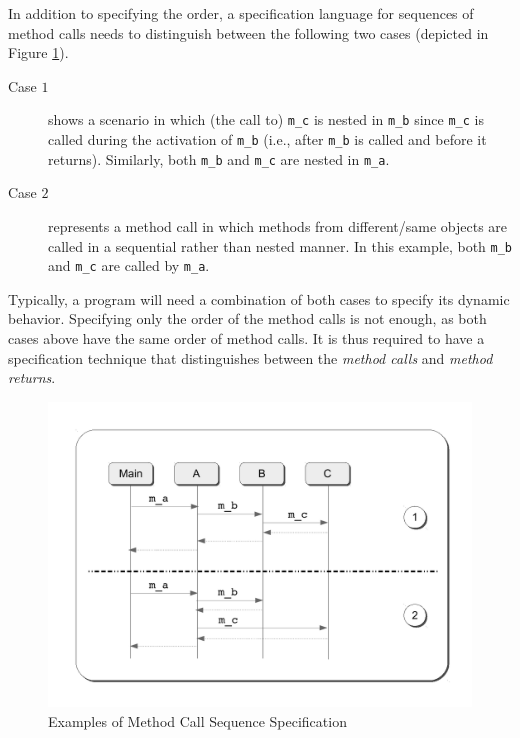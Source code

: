 In addition to specifying the order, a specification language for sequences of method calls
needs to distinguish between the following two cases (depicted in
Figure \ref{fig:seq-spec}).
\begin{description}
  \item[Case $1$] 
  shows a scenario in which (the call to) \texttt{m\_c} is nested in 
  \texttt{m\_b} since \texttt{m\_c} is called during the activation of 
  \texttt{m\_b} (i.e., after \texttt{m\_b} is called and before it returns). 
  Similarly, both \texttt{m\_b} and \texttt{m\_c} are nested in \texttt{m\_a}.
  
  
  \item[Case $2$] represents a method call in which methods from
  different/same objects are called in a sequential rather than nested
  manner. In this example, both \texttt{m\_b} and \texttt{m\_c} are called by
  \texttt{m\_a}.
\end{description}
Typically, a program will need a combination of both cases to specify its dynamic behavior.
Specifying only the order of the method calls is not enough, as both cases above
have the same order of method calls. It is thus required to have a specification
technique that distinguishes between the \textsl{method calls} and
\textsl{method returns}. \begin{figure}[h]
\begin{center}
  \includegraphics[scale=0.4]{images/seq-spec}
  \caption{Examples of Method Call Sequence Specification}
  \label{fig:seq-spec}
\end{center}
\end{figure}

